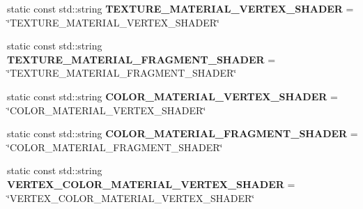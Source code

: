 \begin{DoxyCompactItemize}
\item 
\mbox{\label{struct_geometry_engine_1_1_geometry_material_1_1_material_constants_a9219382ed86fb74eaad9fbaa27df96d0}} 
static const std\+::string {\bfseries T\+E\+X\+T\+U\+R\+E\+\_\+\+M\+A\+T\+E\+R\+I\+A\+L\+\_\+\+V\+E\+R\+T\+E\+X\+\_\+\+S\+H\+A\+D\+ER} = \char`\"{}T\+E\+X\+T\+U\+R\+E\+\_\+\+M\+A\+T\+E\+R\+I\+A\+L\+\_\+\+V\+E\+R\+T\+E\+X\+\_\+\+S\+H\+A\+D\+ER\char`\"{}
\item 
\mbox{\label{struct_geometry_engine_1_1_geometry_material_1_1_material_constants_a35f71cc1031d6ccd70cba1a3382add70}} 
static const std\+::string {\bfseries T\+E\+X\+T\+U\+R\+E\+\_\+\+M\+A\+T\+E\+R\+I\+A\+L\+\_\+\+F\+R\+A\+G\+M\+E\+N\+T\+\_\+\+S\+H\+A\+D\+ER} = \char`\"{}T\+E\+X\+T\+U\+R\+E\+\_\+\+M\+A\+T\+E\+R\+I\+A\+L\+\_\+\+F\+R\+A\+G\+M\+E\+N\+T\+\_\+\+S\+H\+A\+D\+ER\char`\"{}
\item 
\mbox{\label{struct_geometry_engine_1_1_geometry_material_1_1_material_constants_a1dd6f9c9f8f367d9f855571907368ad1}} 
static const std\+::string {\bfseries C\+O\+L\+O\+R\+\_\+\+M\+A\+T\+E\+R\+I\+A\+L\+\_\+\+V\+E\+R\+T\+E\+X\+\_\+\+S\+H\+A\+D\+ER} = \char`\"{}C\+O\+L\+O\+R\+\_\+\+M\+A\+T\+E\+R\+I\+A\+L\+\_\+\+V\+E\+R\+T\+E\+X\+\_\+\+S\+H\+A\+D\+ER\char`\"{}
\item 
\mbox{\label{struct_geometry_engine_1_1_geometry_material_1_1_material_constants_a5ac26b4937de7b8ae9e8deed4c739160}} 
static const std\+::string {\bfseries C\+O\+L\+O\+R\+\_\+\+M\+A\+T\+E\+R\+I\+A\+L\+\_\+\+F\+R\+A\+G\+M\+E\+N\+T\+\_\+\+S\+H\+A\+D\+ER} = \char`\"{}C\+O\+L\+O\+R\+\_\+\+M\+A\+T\+E\+R\+I\+A\+L\+\_\+\+F\+R\+A\+G\+M\+E\+N\+T\+\_\+\+S\+H\+A\+D\+ER\char`\"{}
\item 
\mbox{\label{struct_geometry_engine_1_1_geometry_material_1_1_material_constants_a8a093319196a21e8a5dd73f1e6d633e2}} 
static const std\+::string {\bfseries V\+E\+R\+T\+E\+X\+\_\+\+C\+O\+L\+O\+R\+\_\+\+M\+A\+T\+E\+R\+I\+A\+L\+\_\+\+V\+E\+R\+T\+E\+X\+\_\+\+S\+H\+A\+D\+ER} = \char`\"{}V\+E\+R\+T\+E\+X\+\_\+\+C\+O\+L\+O\+R\+\_\+\+M\+A\+T\+E\+R\+I\+A\+L\+\_\+\+V\+E\+R\+T\+E\+X\+\_\+\+S\+H\+A\+D\+ER\char`\"{}

\end{DoxyCompactItemize}
